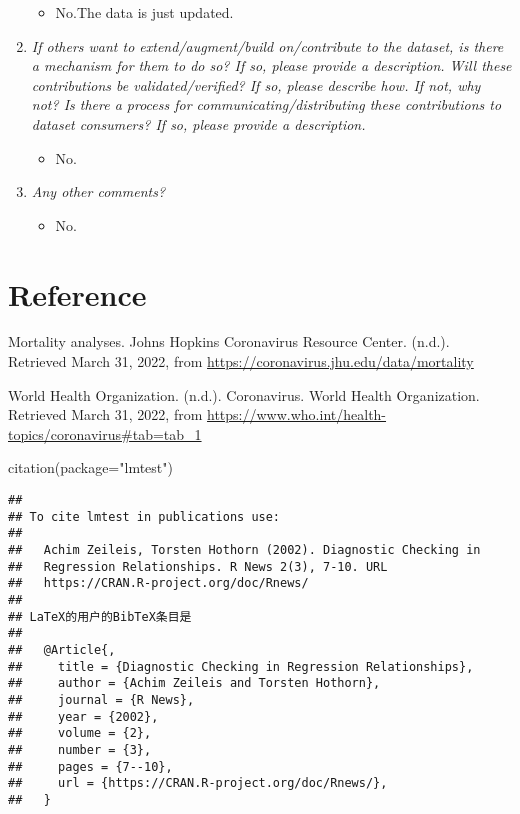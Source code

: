 \documentclass[
]{article}
\newenvironment{Shaded}{\begin{snugshade}}{\end{snugshade}}
\newcommand{\AttributeTok}[1]{\textcolor[rgb]{0.77,0.63,0.00}{#1}}
\newcommand{\FunctionTok}[1]{\textcolor[rgb]{0.00,0.00,0.00}{#1}}
\newcommand{\NormalTok}[1]{#1}
\newcommand{\StringTok}[1]{\textcolor[rgb]{0.31,0.60,0.02}{#1}}
\providecommand{\tightlist}{%
  \setlength{\itemsep}{0pt}\setlength{\parskip}{0pt}}
\begin{document}
\begin{enumerate}
  \begin{itemize}
  \tightlist
  \item
    No.The data is just updated.
  \end{itemize}
\item
  \emph{If others want to extend/augment/build on/contribute to the dataset, is there a mechanism for them to do so? If so, please provide a description. Will these contributions be validated/verified? If so, please describe how. If not, why not? Is there a process for communicating/distributing these contributions to dataset consumers? If so, please provide a description.}

  \begin{itemize}
  \tightlist
  \item
    No.
  \end{itemize}
\item
  \emph{Any other comments?}

  \begin{itemize}
  \tightlist
  \item
    No.
  \end{itemize}
\end{enumerate}

\newpage

\hypertarget{reference}{%
\section{Reference}\label{reference}}

Mortality analyses. Johns Hopkins Coronavirus Resource Center. (n.d.). Retrieved March 31, 2022, from \url{https://coronavirus.jhu.edu/data/mortality}

World Health Organization. (n.d.). Coronavirus. World Health Organization. Retrieved March 31, 2022, from \url{https://www.who.int/health-topics/coronavirus\#tab=tab_1}

\begin{Shaded}
\begin{Highlighting}[]
\FunctionTok{citation}\NormalTok{(}\AttributeTok{package=}\StringTok{"lmtest"}\NormalTok{)}
\end{Highlighting}
\end{Shaded}

\begin{verbatim}
## 
## To cite lmtest in publications use:
## 
##   Achim Zeileis, Torsten Hothorn (2002). Diagnostic Checking in
##   Regression Relationships. R News 2(3), 7-10. URL
##   https://CRAN.R-project.org/doc/Rnews/
## 
## LaTeX的用户的BibTeX条目是
## 
##   @Article{,
##     title = {Diagnostic Checking in Regression Relationships},
##     author = {Achim Zeileis and Torsten Hothorn},
##     journal = {R News},
##     year = {2002},
##     volume = {2},
##     number = {3},
##     pages = {7--10},
##     url = {https://CRAN.R-project.org/doc/Rnews/},
##   }
\end{verbatim}
\end{document}
